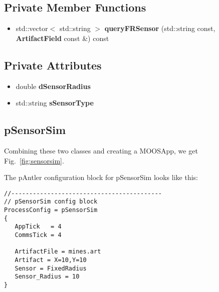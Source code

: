 \subsection*{Private Member Functions}
\begin{itemize}
\item std::vector$<$ std::string $>$ {\bf query\-FRSensor} (std::string const, {\bf Artifact\-Field} const \&) const
\end{itemize}
\subsection*{Private Attributes}
\begin{itemize}
\item double {\bf d\-Sensor\-Radius}
\item std::string {\bf s\-Sensor\-Type}
\end{itemize}

\subsection{pSensorSim}
Combining these two classes and creating a MOOSApp, we get Fig.~\ref{fig:sensorsim}.


The pAntler configuration block for pSensorSim looks like this:
\begin{verbatim}
//------------------------------------------
// pSensorSim config block
ProcessConfig = pSensorSim
{
   AppTick   = 4
   CommsTick = 4
   
   ArtifactFile = mines.art
   Artifact = X=10,Y=10
   Sensor = FixedRadius
   Sensor_Radius = 10   
}
\end{verbatim}

